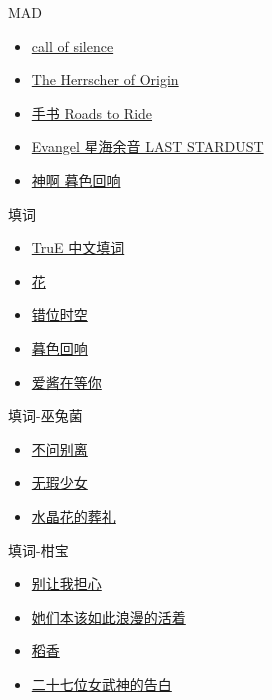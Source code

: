 \documentclass[a4paper]{article}
\begin{document}
MAD

\begin{itemize}
    \item \href{https://www.bilibili.com/video/BV1ZT4y1s7Zd/}{call of silence}
    \item \href{https://www.bilibili.com/video/BV1nV4y1g7ti/}{The Herrscher of Origin}
    \item \href{https://www.bilibili.com/video/BV1cG41157Jx/}{手书 Roads to Ride}
    \item \href{https://www.bilibili.com/video/BV1pp4y1m7Uh/}{Evangel 星海余音 LAST STARDUST}
    \item \href{https://www.bilibili.com/video/BV1ox4y1x7uE/}{神啊 暮色回响}
\end{itemize}

填词

\begin{itemize}
    \item \href{https://www.bilibili.com/video/BV1gB4y1V7XK/}{TruE 中文填词}
    \item \href{https://www.bilibili.com/video/BV1DT41167gi/}{花}
    \item \href{https://www.bilibili.com/video/BV1Le4y1R73E/}{错位时空}
    \item \href{https://www.bilibili.com/video/BV19E421c7gF/}{暮色回响}
    \item \href{https://www.bilibili.com/video/BV1mM4y1E7rp/}{爱酱在等你}
\end{itemize}

填词-巫兔菌

\begin{itemize}
    \item \href{https://www.bilibili.com/video/BV19a4y1S7wF/}{不问别离}
    \item \href{https://www.bilibili.com/video/BV1da411o7r2/}{无瑕少女}
    \item \href{https://www.bilibili.com/video/BV1it4y137GM/}{水晶花的葬礼}
\end{itemize}

填词-柑宝

\begin{itemize}
    \item \href{https://www.bilibili.com/video/BV1vC4y177zp/}{别让我担心}
    \item \href{https://www.bilibili.com/video/BV1pu411a7cv/}{她们本该如此浪漫的活着}
    \item \href{https://www.bilibili.com/video/BV1tt421P7Li/}{稻香}
    \item \href{https://www.bilibili.com/video/BV1cY4y1R7bp/}{二十七位女武神的告白}
\end{itemize}
\end{document}
